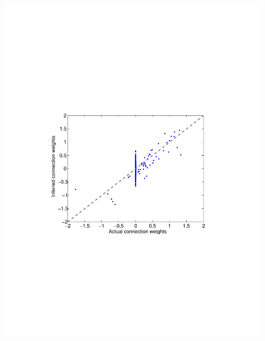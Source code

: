 %
%
\begin{figure}[h]
\centering
\begin{minipage}[c]{0.45\hsize}
\includegraphics[width=\hsize]{../figs/FigureA9_all_same_sol}
\end{minipage}
\begin{minipage}[c]{0.45\hsize}

\end{minipage}
\end{figure}
